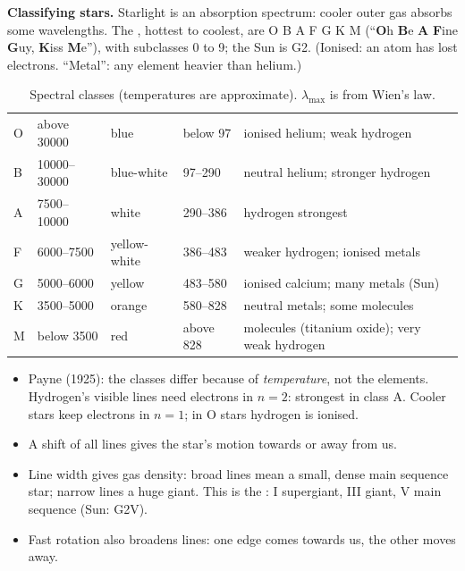\textbf{Classifying stars.} Starlight is an absorption spectrum: cooler outer gas absorbs some
wavelengths. The , hottest to coolest, are O B A F G K M (``\textbf{O}h
\textbf{B}e \textbf{A} \textbf{F}ine \textbf{G}uy, \textbf{K}iss \textbf{M}e''), with
subclasses 0 to 9; the Sun is G2. (Ionised: an atom has lost electrons. ``Metal'': any element
heavier than helium.)

\begin{table}
  \caption{Spectral classes (temperatures are approximate). $\lambda_\mathrm{max}$ is from
    Wien's law.}\label{ch1:tab:classes}
  \centering\small
  \begin{tabular}{@{}C{9mm}L{27mm}L{20mm}L{17mm}L{58mm}@{}}
    \toprule
     &  &  &
       & \\
    \midrule
    O & above \num{30000} & blue & below 97 & ionised helium; weak hydrogen\\
    B & \num{10000}--\num{30000} & blue-white & 97--290 & neutral helium; stronger hydrogen\\
    A & \num{7500}--\num{10000} & white & 290--386 & hydrogen strongest\\
    F & \num{6000}--\num{7500} & yellow-white & 386--483 & weaker hydrogen; ionised metals\\
    G & \num{5000}--\num{6000} & yellow & 483--580 & ionised calcium; many metals (Sun)\\
    K & \num{3500}--\num{5000} & orange & 580--828 & neutral metals; some molecules\\
    M & below \num{3500} & red & above 828 & molecules (titanium oxide); very weak hydrogen\\
    \bottomrule
  \end{tabular}
\end{table}

\begin{itemize}
  \item Payne (1925): the classes differ because of \emph{temperature}, not the elements.
        Hydrogen's visible lines need electrons in $n = 2$: strongest in class A. Cooler stars
        keep electrons in $n = 1$; in O stars hydrogen is ionised.
  \item A shift of all lines gives the star's motion towards or away from us.
  \item Line width gives gas density: broad lines mean a small, dense main sequence star;
        narrow lines a huge giant. This is the : I supergiant, III
        giant, V main sequence (Sun: G2V).
  \item Fast rotation also broadens lines: one edge comes towards us, the other moves away.
\end{itemize}

